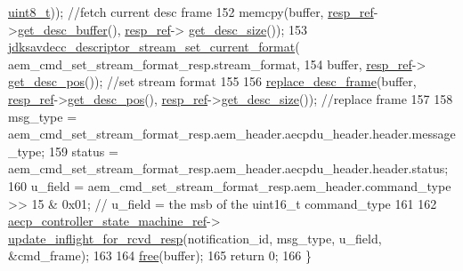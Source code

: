\begin{DoxyCode}
      \hyperlink{stdint_8h_aba7bc1797add20fe3efdf37ced1182c5}{uint8\_t})); \textcolor{comment}{//fetch current desc frame}
152     memcpy(buffer, \hyperlink{classavdecc__lib_1_1descriptor__base__imp_a2642e3a7c10d38553e7ff4a55e875346}{resp\_ref}->\hyperlink{classavdecc__lib_1_1response__frame_a87db6e7ad7e047437cf9c9eaab873626}{get\_desc\_buffer}(), \hyperlink{classavdecc__lib_1_1descriptor__base__imp_a2642e3a7c10d38553e7ff4a55e875346}{resp\_ref}->
      \hyperlink{classavdecc__lib_1_1response__frame_a5302ae13c549f066040ce0e7c7d11ae6}{get\_desc\_size}());
153     \hyperlink{group__descriptor__stream_ga548deb717063430826d2498e6329e06f}{jdksavdecc\_descriptor\_stream\_set\_current\_format}(
      aem\_cmd\_set\_stream\_format\_resp.stream\_format,
154                                                     buffer, \hyperlink{classavdecc__lib_1_1descriptor__base__imp_a2642e3a7c10d38553e7ff4a55e875346}{resp\_ref}->
      \hyperlink{classavdecc__lib_1_1response__frame_a6e6f6cc3d681d41c6de6139ca9cb79d9}{get\_desc\_pos}()); \textcolor{comment}{//set stream format}
155 
156     \hyperlink{classavdecc__lib_1_1descriptor__base__imp_a8dbf7d4faedf36ec789d33f228e22039}{replace\_desc\_frame}(buffer, \hyperlink{classavdecc__lib_1_1descriptor__base__imp_a2642e3a7c10d38553e7ff4a55e875346}{resp\_ref}->\hyperlink{classavdecc__lib_1_1response__frame_a6e6f6cc3d681d41c6de6139ca9cb79d9}{get\_desc\_pos}(), 
      \hyperlink{classavdecc__lib_1_1descriptor__base__imp_a2642e3a7c10d38553e7ff4a55e875346}{resp\_ref}->\hyperlink{classavdecc__lib_1_1response__frame_a5302ae13c549f066040ce0e7c7d11ae6}{get\_desc\_size}()); \textcolor{comment}{//replace frame}
157 
158     msg\_type = aem\_cmd\_set\_stream\_format\_resp.aem\_header.aecpdu\_header.header.message\_type;
159     status = aem\_cmd\_set\_stream\_format\_resp.aem\_header.aecpdu\_header.header.status;
160     u\_field = aem\_cmd\_set\_stream\_format\_resp.aem\_header.command\_type >> 15 & 0x01; \textcolor{comment}{// u\_field = the msb of
       the uint16\_t command\_type}
161 
162     \hyperlink{namespaceavdecc__lib_a0b1b5aea3c0490f77cbfd9178af5be22}{aecp\_controller\_state\_machine\_ref}->
      \hyperlink{classavdecc__lib_1_1aecp__controller__state__machine_a997abd9786c330a5505e903e6443208e}{update\_inflight\_for\_rcvd\_resp}(notification\_id, msg\_type, u\_field, &cmd\_frame);
163 
164     \hyperlink{_memory_leak_detector_malloc_macros_8h_aa7157aa9480bb73f090dca36776419bf}{free}(buffer);
165     \textcolor{keywordflow}{return} 0;
166 \}
\end{DoxyCode}


